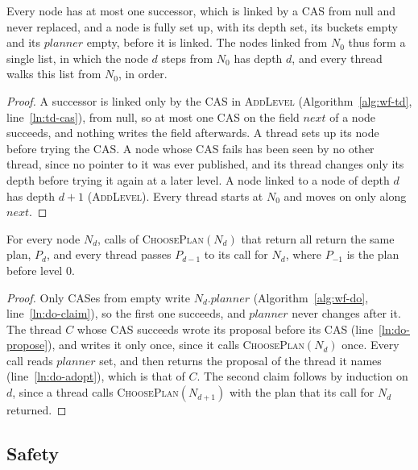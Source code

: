 \begin{lemma}
\label{lem:list}
Every node has at most one successor, which is linked by a CAS from null and never replaced, and a node is fully set up, with its depth set, its buckets empty and its $\mathit{planner}$ empty, before it is linked. The nodes linked from $N_0$ thus form a single list, in which the node $d$ steps from $N_0$ has depth $d$, and every thread walks this list from $N_0$, in order.
\end{lemma}
\begin{proof}
A successor is linked only by the CAS in \textsc{AddLevel} (Algorithm~\ref{alg:wf-td}, line~\ref{ln:td-cas}), from null, so at most one CAS on the field $\mathit{next}$ of a node succeeds, and nothing writes the field afterwards. A thread sets up its node before trying the CAS. A node whose CAS fails has been seen by no other thread, since no pointer to it was ever published, and its thread changes only its depth before trying it again at a later level. A node linked to a node of depth $d$ has depth $d+1$ (\textsc{AddLevel}). Every thread starts at $N_0$ and moves on only along $\mathit{next}$.
\end{proof}

\begin{lemma}[Plans]
\label{lem:plans}
For every node $N_d$, calls of \textsc{ChoosePlan}$(N_d)$ that return all return the same plan, $P_d$, and every thread passes $P_{d-1}$ to its call for $N_d$, where $P_{-1}$ is the plan before level 0.
\end{lemma}
\begin{proof}
Only CASes from empty write $N_d.\mathit{planner}$ (Algorithm~\ref{alg:wf-do}, line~\ref{ln:do-claim}), so the first one succeeds, and $\mathit{planner}$ never changes after it. The thread $C$ whose CAS succeeds wrote its proposal before its CAS (line~\ref{ln:do-propose}), and writes it only once, since it calls \textsc{ChoosePlan}$(N_d)$ once. Every call reads $\mathit{planner}$ set, and then returns the proposal of the thread it names (line~\ref{ln:do-adopt}), which is that of $C$. The second claim follows by induction on $d$, since a thread calls \textsc{ChoosePlan}$(N_{d+1})$ with the plan that its call for $N_d$ returned.
\end{proof}

\subsection{Safety}
\label{sec:pf-safety}

